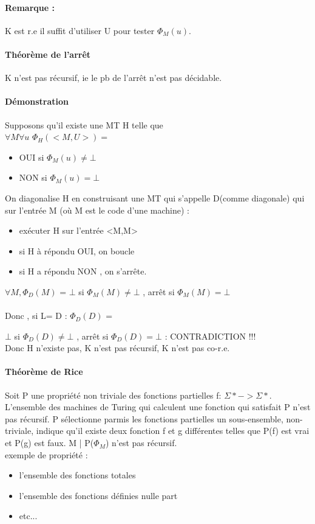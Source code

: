 \documentclass{article}
\begin{document}
{\paragraph{Remarque : } K est r.e il suffit d'utiliser U pour tester $\Phi_{M}(u)$.
\paragraph{Théorème de l’arrêt} K n'est pas récursif, ie le pb de l’arrêt n'est pas décidable.
\paragraph{Démonstration} Supposons qu'il existe une MT H telle que \\$\forall M\forall u$   $\Phi_{H}(<M,U>)=$
\begin{itemize}
\item OUI si $\Phi_{M}(u) \neq \bot$
\item NON si $\Phi_{M}(u) = \bot$
\end{itemize}
On diagonalise H en construisant une MT qui s'appelle D(comme diagonale) qui sur l'entrée M (où M est le code d'une machine) : 
\begin{itemize}
\item exécuter H sur l'entrée <M,M>
\item si H à répondu OUI, on boucle
\item si H a répondu NON , on s'arrête.
\end{itemize}
$\forall M, \Phi_{D}(M)$ =  { $\bot$ si $\Phi_{M}(M) \neq \bot$ , arrêt  si $\Phi_{M}(M) = \bot$}\\\\Donc , si L= D :  $\Phi_{D}(D)$ =  { $\bot$ si $\Phi_{D}(D) \neq \bot$ , arrêt  si $\Phi_{D}(D) = \bot$  : CONTRADICTION !!!\\
Donc H n'existe pas, K n'est pas récursif, K n'est pas co-r.e.
\paragraph{Théorème de Rice} Soit P une propriété non triviale des fonctions partielles f: $\Sigma * -> \Sigma *$.\\L'ensemble des machines de Turing qui calculent une fonction qui satisfait P n'est pas récursif. P sélectionne parmis les fonctions partielles un sous-ensemble, non-triviale, indique qu'il existe deux fonction f et g différentes telles que P(f) est vrai et P(g) est faux. { M | P($\Phi_{M}$)} n'est pas récursif.\\exemple de propriété : \begin{itemize}
\item l'ensemble des fonctions totales
\item l'ensemble des fonctions définies nulle part
\item etc...
\end{itemize}

}}
\end{document}
